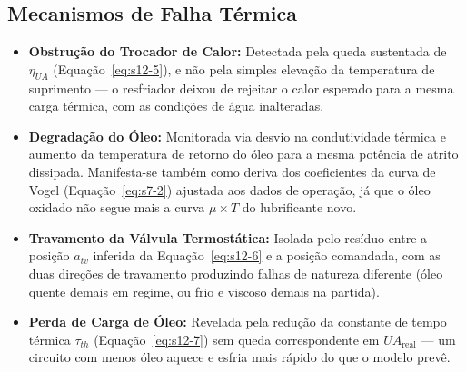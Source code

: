 \documentclass[12pt,a4paper]{article}
\numberwithin{equation}{section}
\numberwithin{table}{section}
\numberwithin{figure}{section}
\begin{document}
	\subsection{\textbf{Mecanismos de Falha Térmica}}
	\begin{itemize}
		\item \textbf{Obstrução do Trocador de Calor:} Detectada pela queda sustentada de $\eta_{UA}$ (Equação~\eqref{eq:s12-5}), e não pela simples elevação da temperatura de suprimento — o resfriador deixou de rejeitar o calor esperado para a mesma carga térmica, com as condições de água inalteradas.
		\item \textbf{Degradação do Óleo:} Monitorada via desvio na condutividade térmica e aumento da temperatura de retorno do óleo para a mesma potência de atrito dissipada. Manifesta-se também como deriva dos coeficientes da curva de Vogel (Equação~\eqref{eq:s7-2}) ajustada aos dados de operação, já que o óleo oxidado não segue mais a curva $\mu \times T$ do lubrificante novo.
		\item \textbf{Travamento da Válvula Termostática:} Isolada pelo resíduo entre a posição $a_{tv}$ inferida da Equação~\eqref{eq:s12-6} e a posição comandada, com as duas direções de travamento produzindo falhas de natureza diferente (óleo quente demais em regime, ou frio e viscoso demais na partida).
		\item \textbf{Perda de Carga de Óleo:} Revelada pela redução da constante de tempo térmica $\tau_{th}$ (Equação~\eqref{eq:s12-7}) sem queda correspondente em $UA_{\text{real}}$ — um circuito com menos óleo aquece e esfria mais rápido do que o modelo prevê.
	\end{itemize}
\end{document}
